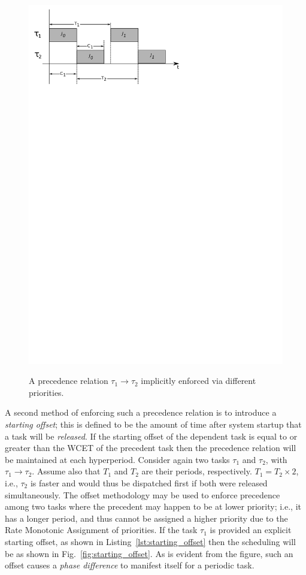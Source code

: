 \begin{figure}
\centering
\includegraphics[scale=0.75]{figs/precedence_priority}
\label{fig:precendence_priority}
\caption{A precedence relation $\tau_1 \to \tau_2$ implicitly enforced
  via different priorities.}
\end{figure}

A second method of enforcing such a precedence relation is to
introduce a \emph{starting offset}; this is defined to be the amount
of time after system startup that a task will be \emph{released}. If
the starting offset of the dependent task is equal to or greater than
the WCET of the precedent task then the precedence relation will be
maintained at each hyperperiod. Consider again two tasks $\tau_1$ and
$\tau_2$, with $\tau_1 \to \tau_2$. Assume also that $T_1$ and $T_2$
are their periods, respectively. $T_1 = T_2 \times 2$, i.e., $\tau_2$
is faster and would thus be dispatched first if both were released
simultaneously. The offset methodology may be used to enforce
precedence among two tasks where the precedent may happen to be at
lower priority; i.e., it has a longer period, and thus cannot be
assigned a higher priority due to the Rate Monotonic Assignment of
priorities. If the task $\tau_1$ is provided an explicit starting
offset, as shown in Listing~\ref{lst:starting_offset} then the
scheduling will be as shown in Fig.~\ref{fig:starting_offset}. As is
evident from the figure, such an offset causes a \emph{phase
  difference} to manifest itself for a periodic task.

